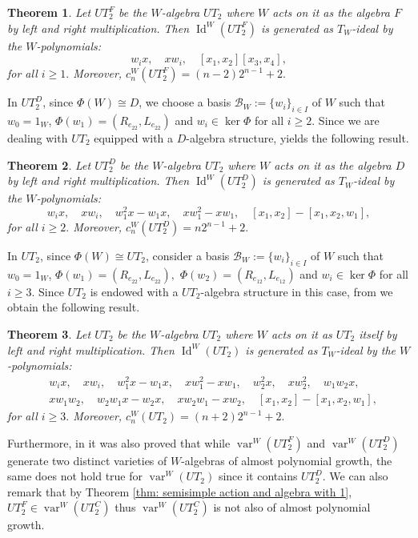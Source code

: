\documentclass[reqno]{amsart}
\newtheorem{theorem}{Theorem}
\theoremstyle{definition}
\numberwithin{equation}{section}
\numberwithin{theorem}{section}
\DeclareMathOperator{\V}{var}
\DeclareMathOperator{\I}{Id}
\begin{document}
\begin{theorem}\label{identita e codimensioni di UT2F}
    Let $UT_2^F$ be the $W$-algebra 
    $UT_2$ where $W$ acts on it as the algebra $F$ by left and right multiplication.
    Then $\I^W(UT_2^F)$ is generated as $T_W$-ideal by the $W$-polynomials:
    $$
    w_i x, \quad xw_i, \quad [x_1,x_2][x_3,x_4],
    $$
    for all $i\geq 1.$ Moreover, $c_n^W(UT_2^F) = (n-2)2^{n-1}+2.$
\end{theorem}

In $UT_2^D$, since $\Phi(W)\cong D$, we choose a basis $\mathcal{B}_W:=\{w_i\}_{i\in I}$ of $W$ such that $w_0=1_W$, $\Phi(w_1)=(R_{e_{22}},L_{e_{22}})$ and $w_i\in \ker \Phi$ for all $i \geq 2$. Since we are dealing with $UT_2$ equipped with a $D$-algebra structure, \cite[Theorem 5.1]{MartinoRizzo2024} yields the following result.

\begin{theorem}\label{identita e codimensioni di UT2D}
    Let $UT_2^D$ be the $W$-algebra 
    $UT_2$ where $W$ acts on it as the algebra $D$ by left and right multiplication.
   Then $\I^W(UT_2^D)$ is generated as $T_W$-ideal by the $W$-polynomials:
    $$
    w_i x, \quad xw_i, \quad  w_1^2 x- w_1 x, \quad  x w_1^2 - x w_1, \quad [x_1,x_2]-[x_1,x_2,w_1],
    $$
    for all $i\geq 2.$
    Moreover, $c_n^W(UT_2^D) = n2^{n-1}+2.$
\end{theorem}

 In $UT_2$, since $\Phi(W)\cong UT_2$, consider a basis $\mathcal{B}_W:=\{w_i\}_{i\in I}$ of $W$ such that $w_0=1_W$, $\Phi(w_1)= (R_{e_{22}},L_{e_{22}}),$ $ \Phi(w_2)=(R_{e_{12}},L_{e_{12}})$ and $w_i\in \ker \Phi$ for all $i \geq 3$. Since $UT_2$ is endowed with a $UT_2$-algebra structure in this case, from \cite[Theorem 3.2]{MartinoRizzo2024} we obtain the following result.

\begin{theorem}\label{identita e codimensioni di UT2full}
    Let $UT_2$ be the $W$-algebra  
    $UT_2$ where $W$ acts on it as $UT_2$ itself  by left and right multiplication. 
    Then $\I^W(UT_2)$ is generated as $T_W$-ideal by the $W$-polynomials:
     \begin{align*}
     &  w_i x, \quad xw_i, \quad w_1^2x - w_1 x, \quad  x w_1^2 - x w_1, \quad w_2^2 x, \quad xw_2^2,\quad w_1w_2x, \\
     & xw_1w_2, \quad  w_2w_1x-w_2x,  \quad xw_2w_1-xw_2,  \quad [x_1,x_2]-[x_1,x_2,w_1], 
    \end{align*}
    for all $i\geq 3.$ Moreover, $c_n^W(UT_2) = (n+2)2^{n-1}+2.$
\end{theorem}
 Furthermore, in \cite{MartinoRizzo2024} it was also proved that while $\V^W(UT_2^F)$ and $\V^W(UT_2^D)$ generate two distinct varieties of $W$-algebras of almost polynomial growth, the same does not hold true for $\V^W(UT_2)$ since it contains $UT_2^D.$ We can also remark that by Theorem \ref{thm: semisimple action and algebra with 1}, $UT_2^F\in\V^W(UT_2^C)$ thus $\V^W(UT_2^C)$ is not also of almost polynomial growth.
\end{document}

